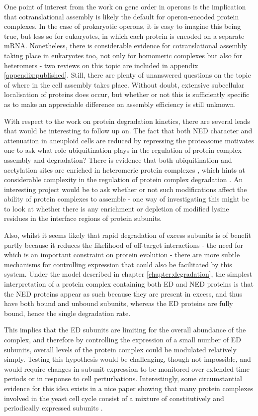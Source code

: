 \documentclass[a4paper,11pt,twoside,openright]{scrbook}
\begin{document}
One point of interest from the work on gene order in operons is the implication that cotranslational assembly is likely the default for operon-encoded protein complexes. In the case of prokaryotic operons, it is easy to imagine this being true, but less so for eukaryotes, in which each protein is encoded on a separate mRNA. Nonetheless, there is considerable evidence for cotranslational assembly taking place in eukaryotes too, not only for homomeric complexes but also for heteromers - two reviews on this topic are included in appendix \ref{appendix:published}. Still, there are plenty of unanswered questions on the topic of where in the cell assembly takes place. Without doubt, extensive subcellular localisation of proteins does occur, but whether or not this is sufficiently specific as to make an appreciable difference on assembly efficiency is still unknown.

With respect to the work on protein degradation kinetics, there are several leads that would be interesting to follow up on. The fact that both NED character and attenuation in aneuploid cells are reduced by repressing the proteasome motivates one to ask what role ubiquitination plays in the regulation of protein complex assembly and degradation? There is evidence that both ubiquitination and acetylation sites are enriched in heteromeric protein complexes \cite{Chen2014,Choudhary2009}, which hints at considerable complexity in the regulation of protein complex degradation \cite{Caron2005}. An interesting project would be to ask whether or not such modifications affect the ability of protein complexes to assemble - one way of investigating this might be to look at whether there is any enrichment or depletion of modified lysine residues in the interface regions of protein subunits.

Also, whilst it seems likely that rapid degradation of excess subunits is of benefit partly because it reduces the likelihood of off-target interactions  - the need for which is an important constraint on protein evolution \cite{Yang2012} - there are more subtle mechanisms for controlling expression that could also be facilitated by this system. Under the model described in chapter \ref{chapter:degradation}, the simplest interpretation of a protein complex containing both ED and NED proteins is that the NED proteins appear as such because they are present in excess, and thus have both bound and unbound subunits, whereas the ED proteins are fully bound, hence the single degradation rate.

This implies that the ED subunits are limiting for the overall abundance of the complex, and therefore by controlling the expression of a small number of ED subunits, overall levels of the protein complex could be modulated relatively simply. Testing this hypothesis would be challenging, though not impossible, and would require changes in subunit expression to be monitored over extended time periods or in response to cell perturbations. Interestingly, some circumstantial evidence for this idea exists in a nice paper showing that many protein complexes involved in the yeast cell cycle consist of a mixture of constitutively and periodically expressed subunits \cite{Lichtenberg2005}.
\end{document}
